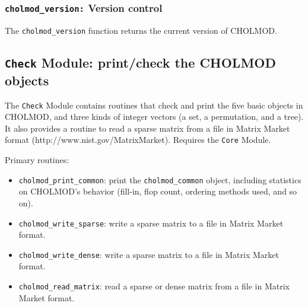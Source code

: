 \documentclass[11pt]{article}
\begin{document}
\subsubsection{{\tt cholmod\_version:} Version control}
The {\tt cholmod\_version} function returns the current version of CHOLMOD.

\newpage \subsection{{\tt Check} Module: print/check the CHOLMOD objects}
    The {\tt Check} Module contains routines that check and print the five
    basic objects in CHOLMOD, and three kinds of integer vectors (a set,
    a permutation, and a tree).  It also provides a routine to read a sparse
    matrix from a file in Matrix Market format (http://www.nist.gov/MatrixMarket).
    Requires the {\tt Core} Module.

\vspace{0.1in}
\noindent Primary routines:
    \begin{itemize}
    \item {\tt cholmod\_print\_common}: print the {\tt cholmod\_common} object,
	including statistics on CHOLMOD's behavior (fill-in, flop count,
	ordering methods used, and so on).
    \item {\tt cholmod\_write\_sparse}: write a sparse matrix to a file
	in Matrix Market format.
    \item {\tt cholmod\_write\_dense}: write a sparse matrix to a file
	in Matrix Market format.
    \item {\tt cholmod\_read\_matrix}: read a sparse or dense matrix from a file
	in Matrix Market format.
    \end{itemize}
\end{document}
